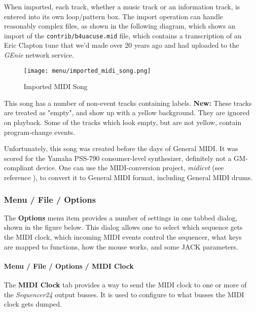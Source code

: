    When imported, each track, whether a music track or an information track,
   is entered into its own loop/pattern box.  The import operation can
   handle reasonably complex files, as shown in the following diagram, which
   shows an import of the \texttt{contrib/b4uacuse.mid} file, which contains
   a transcription of an Eric Clapton tune that we'd made over 20 
   years ago and had uploaded to the \textsl{GEnie} network service.

\begin{figure}[H]
   \centering 
   \texttt{[image: menu/imported\_midi\_song.png]}
   \caption{Imported MIDI Song}
   \label{fig:seq24_imported_midi_song}
\end{figure}

   This song has a number of non-event tracks containing labels.
   \textbf{New:}
   These tracks are treated as "empty", and show up with a yellow
   background.  They are ignored on playback.   Some of the tracks
   which look empty, but are not yellow, contain program-change events.

   Unfortunately, this song was created before the days of General MIDI.
   It was scored for the Yamaha PSS-790 consumer-level synthesizer,
   definitely not a GM-compliant device.
   One can use the MIDI-conversion project, \textsl{midicvt}
   (see reference \cite{midicvt}),
   to convert it to General MIDI format, including General MIDI drums.

\subsubsection{Menu / File / Options}
\label{subsubsec:seq24_menu_file_options}

   The \textbf{Options} menu item provides a number of settings in one
   tabbed dialog, shown in the figure below.
   This dialog allows one to select which sequence gets the MIDI
   clock, which incoming MIDI events control the sequencer, what keys are
   mapped to functions, how the mouse works, and some JACK parameters.

\paragraph{Menu / File / Options / MIDI Clock}
\label{paragraph:seq24_menu_file_options_midi_clock}

   The \textbf{MIDI Clock} tab provides a way to send the MIDI clock to one
   or more of the \textsl{Sequencer24} output busses.
   It is used to configure to what busses the MIDI clock gets dumped.

